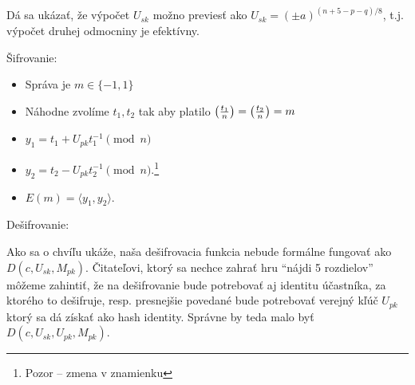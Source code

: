 \begin{poznamka}
    Dá sa ukázať, že výpočet $U_{sk}$ možno previesť ako
    $U_{sk} = (\pm a)^{(n + 5 - p - q)/8}$, t.j. výpočet
    druhej odmocniny je efektívny.
\end{poznamka}

\noindent
Šifrovanie:
\begin{itemize}
    \item Správa je $m\in\{-1,1\}$
    \item Náhodne zvolíme $t_1,t_2$ tak aby platilo
            $\left( \frac{t_1}{n} \right) = \left( \frac{t_2}{n} \right) = m$
    \item $y_1 = t_1 + U_{pk} t_1^{-1} \pmod{n}$
    \item $y_2 = t_2 - U_{pk} t_2^{-1} \pmod{n}$.\footnote{
            Pozor -- zmena v znamienku}
    \item $E(m) = \langle y_1, y_2 \rangle$.
\end{itemize}


\noindent
Dešifrovanie:

\begin{poznamka}
    Ako sa o chvíľu ukáže, naša dešifrovacia funkcia
    nebude formálne fungovať ako $D(c,U_{sk}, M_{pk})$.
    Čitateľovi, ktorý sa nechce zahrať hru ``nájdi 5 rozdielov''
    môžeme zahintiť, že na dešifrovanie bude potrebovať aj identitu
    účastníka, za ktorého to dešifruje, resp. presnejšie povedané bude
    potrebovať verejný kľúč $U_{pk}$ ktorý sa dá získať ako hash
    identity. Správne by teda malo byť $D(c,U_{sk},U_{pk}, M_{pk})$.
\end{poznamka}

